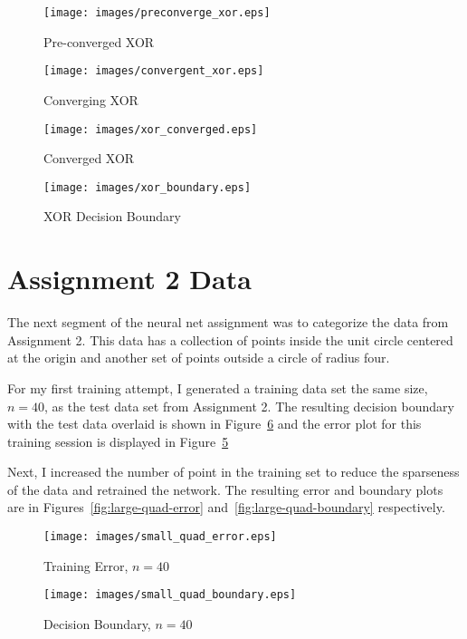\documentclass{article}
\begin{document}
\begin{figure}
  \centering
  \texttt{[image: images/preconverge\_xor.eps]}
  \caption{Pre-converged XOR}
  \label{fig:xor-pre}
\end{figure}

\begin{figure}
  \centering
  \texttt{[image: images/convergent\_xor.eps]}
  \caption{Converging XOR}
  \label{fig:xor-converging}
\end{figure}

\begin{figure}
  \centering
  \texttt{[image: images/xor\_converged.eps]}
  \caption{Converged XOR}
  \label{fig:xor-converged}
\end{figure}

\begin{figure}
  \centering
  \texttt{[image: images/xor\_boundary.eps]}
  \caption{XOR Decision Boundary}
  \label{fig:xor-boundary}
\end{figure}

\section*{Assignment 2 Data}
The next segment of the neural net assignment was to categorize the
data from Assignment 2.  This data has a collection of points inside
the unit circle centered at the origin and another set of points
outside a circle of radius four.

For my first training attempt, I generated a training data set the
same size, $n=40$, as the test data set from Assignment 2.  The
resulting decision boundary with the test data overlaid is shown in
Figure~\ref{fig:small-quad-boundary} and the error plot for this training
session is displayed in Figure~\ref{fig:small-quad-error}

Next, I increased the number of point in the training set to reduce
the sparseness of the data and retrained the network.  The resulting
error and boundary plots are in Figures~\ref{fig:large-quad-error}
and~\ref{fig:large-quad-boundary} respectively.



\begin{figure}
  \centering
  \texttt{[image: images/small\_quad\_error.eps]}
  \caption{Training Error, $n=40$}
  \label{fig:small-quad-error}
\end{figure}

\begin{figure}
  \centering
  \texttt{[image: images/small\_quad\_boundary.eps]}
  \caption{Decision Boundary, $n=40$}
  \label{fig:small-quad-boundary}
\end{figure}
\end{document}
